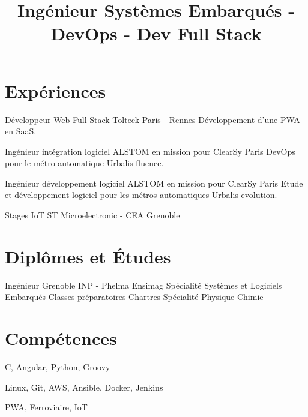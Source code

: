 \documentclass[11pt,a4paper]{moderncv}
\title{\large Ingénieur Systèmes Embarqués - DevOps - Dev Full Stack}
\begin{document}
\maketitle

\section{Expériences}

  {Développeur Web Full Stack}
  {Tolteck}
  {}
  {Paris - Rennes}
  {Développement d'une PWA en SaaS.}

  \cvline{}{}

  {Ingénieur intégration logiciel}
  {ALSTOM en mission pour ClearSy}
  {}
  {Paris}
  {DevOps pour le métro automatique Urbalis fluence.}

  \cvline{}{}

  {Ingénieur développement logiciel}
  {ALSTOM en mission pour ClearSy}
  {}
  {Paris}
  {Etude et développement logiciel pour les métros automatiques Urbalis evolution.}

  \cvline{}{}

  {Stages IoT}
  {ST Microelectronic - CEA}
  {}
  {Grenoble}
  {}

\section{Diplômes et Études}
  {Ingénieur Grenoble INP - Phelma Ensimag}
  {}
  {}
  {}
  {Spécialité Systèmes et Logiciels Embarqués\newline{}}
  {Classes préparatoires}
  {}
  {}
  {Chartres}
  {Spécialité Physique Chimie\newline{}}

\section{Compétences}

  {C, Angular, Python, Groovy\newline{}}

  {Linux, Git, AWS, Ansible, Docker, Jenkins\newline{}}

  {PWA, Ferroviaire, IoT\newline{}}
\end{document}
